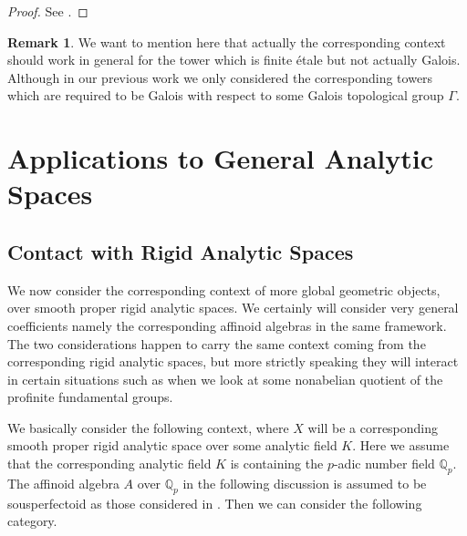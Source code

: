 \documentclass[12pt]{amsart}
\theoremstyle{definition}
\newtheorem{remark}[theorem]{Remark}
\numberwithin{equation}{section}
\begin{document}
\begin{proof}
See \cite[Theorem 5.7.11]{KL16}.	
\end{proof}

\begin{remark}
We want to mention here that actually the corresponding context should work in general for the tower which is finite \'etale but not actually Galois. Although in our previous work \cite{XT2} we only considered the corresponding towers which are required to be Galois with respect to some Galois topological group $\Gamma$.	
\end{remark}










\newpage



\section{Applications to General Analytic Spaces}


\subsection{Contact with Rigid Analytic Spaces}

\indent We now consider the corresponding context of more global geometric objects, over smooth proper rigid analytic spaces. We certainly will consider very general coefficients namely the corresponding affinoid algebras in the same framework. The two considerations happen to carry the same context coming from the corresponding rigid analytic spaces, but more strictly speaking they will interact in certain situations such as when we look at some nonabelian quotient of the profinite fundamental groups.







\indent We basically consider the following context, where $X$ will be a corresponding smooth proper rigid analytic space over some analytic field $K$. Here we assume that the corresponding analytic field $K$ is containing the $p$-adic number field $\mathbb{Q}_p$. The affinoid algebra $A$ over $\mathbb{Q}_p$ in the following discussion is assumed to be sousperfectoid as those considered in \cite{KH}. Then we can consider the following category.
\end{document}
